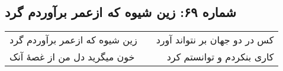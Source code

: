 \begin{center}
\section*{شماره ۶۹: زین شیوه که ازعمر برآوردم گرد}
\label{sec:069}
\begin{longtable}{l p{0.5cm} r}
زین شیوه که ازعمر برآوردم گرد
&&
کس در دو جهان بر نتواند آورد
\\
خون میگرید دل من از غصهٔ آنک
&&
کاری بنکردم و توانستم کرد
\\
\end{longtable}
\end{center}
